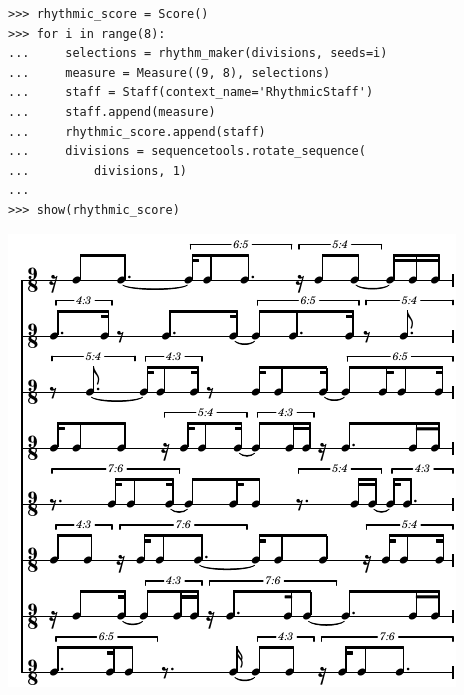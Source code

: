 \documentclass{article}
\begin{document}
\begin{lstlisting}
>>> rhythmic_score = Score()
>>> for i in range(8):
...     selections = rhythm_maker(divisions, seeds=i)
...     measure = Measure((9, 8), selections)
...     staff = Staff(context_name='RhythmicStaff')
...     staff.append(measure)
...     rhythmic_score.append(staff)
...     divisions = sequencetools.rotate_sequence(
...         divisions, 1)
...
>>> show(rhythmic_score)
\end{lstlisting}
\includegraphics{assets/lilypond-89acf493fafea6ee83e3032bbed09718.pdf}
\end{document}
